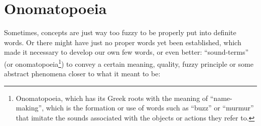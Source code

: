 \section{Onomatopoeia}\label{sec:onomatopoeia}

Sometimes, concepts are just way too fuzzy to be properly put into definite words.
Or there might have just no proper words yet been established, which made it necessary to develop our own few words, or even better: ``sound-terms'' (or onomatopoeia\footnote{Onomatopoeia, which has its Greek roots with the meaning of ``name-making'', which is the formation or use of words such as ``buzz'' or ``murmur'' that imitate the sounds associated with the objects or actions they refer to.}) to convey a certain meaning, quality, fuzzy principle or some abstract phenomena closer to what it meant to be:

